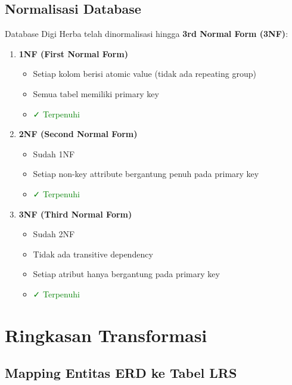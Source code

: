 \documentclass[12pt,a4paper]{article}
\begin{document}
\subsection{Normalisasi Database}

Database Digi Herba telah dinormalisasi hingga \textbf{3rd Normal Form (3NF)}:

\begin{enumerate}
    \item \textbf{1NF (First Normal Form)}
    \begin{itemize}
        \item Setiap kolom berisi atomic value (tidak ada repeating group)
        \item Semua tabel memiliki primary key
        \item \textcolor{green}{✓ Terpenuhi}
    \end{itemize}
    
    \item \textbf{2NF (Second Normal Form)}
    \begin{itemize}
        \item Sudah 1NF
        \item Setiap non-key attribute bergantung penuh pada primary key
        \item \textcolor{green}{✓ Terpenuhi}
    \end{itemize}
    
    \item \textbf{3NF (Third Normal Form)}
    \begin{itemize}
        \item Sudah 2NF
        \item Tidak ada transitive dependency
        \item Setiap atribut hanya bergantung pada primary key
        \item \textcolor{green}{✓ Terpenuhi}
    \end{itemize}
\end{enumerate}

\newpage

\section{Ringkasan Transformasi}

\subsection{Mapping Entitas ERD ke Tabel LRS}
\end{document}

